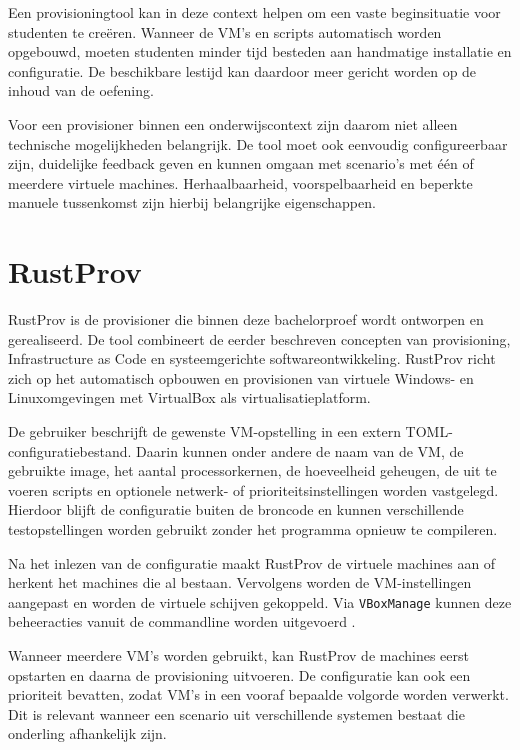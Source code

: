 Een provisioningtool kan in deze context helpen om een vaste beginsituatie voor studenten te creëren. Wanneer de VM's en scripts automatisch worden opgebouwd, moeten studenten minder tijd besteden aan handmatige installatie en configuratie. De beschikbare lestijd kan daardoor meer gericht worden op de inhoud van de oefening.

Voor een provisioner binnen een onderwijscontext zijn daarom niet alleen technische mogelijkheden belangrijk. De tool moet ook eenvoudig configureerbaar zijn, duidelijke feedback geven en kunnen omgaan met scenario's met één of meerdere virtuele machines. Herhaalbaarheid, voorspelbaarheid en beperkte manuele tussenkomst zijn hierbij belangrijke eigenschappen.

\section{RustProv}

RustProv is de provisioner die binnen deze bachelorproef wordt ontworpen en gerealiseerd. De tool combineert de eerder beschreven concepten van provisioning, Infrastructure as Code en systeemgerichte softwareontwikkeling. RustProv richt zich op het automatisch opbouwen en provisionen van virtuele Windows- en Linuxomgevingen met VirtualBox als virtualisatieplatform.

De gebruiker beschrijft de gewenste VM-opstelling in een extern TOML-configuratiebestand. Daarin kunnen onder andere de naam van de VM, de gebruikte image, het aantal processorkernen, de hoeveelheid geheugen, de uit te voeren scripts en optionele netwerk- of prioriteitsinstellingen worden vastgelegd. Hierdoor blijft de configuratie buiten de broncode en kunnen verschillende testopstellingen worden gebruikt zonder het programma opnieuw te compileren.

Na het inlezen van de configuratie maakt RustProv de virtuele machines aan of herkent het machines die al bestaan. Vervolgens worden de VM-instellingen aangepast en worden de virtuele schijven gekoppeld. Via \texttt{VBoxManage} kunnen deze beheeracties vanuit de commandline worden uitgevoerd \autocite{Oracle2022}.

Wanneer meerdere VM's worden gebruikt, kan RustProv de machines eerst opstarten en daarna de provisioning uitvoeren. De configuratie kan ook een prioriteit bevatten, zodat VM's in een vooraf bepaalde volgorde worden verwerkt. Dit is relevant wanneer een scenario uit verschillende systemen bestaat die onderling afhankelijk zijn.

